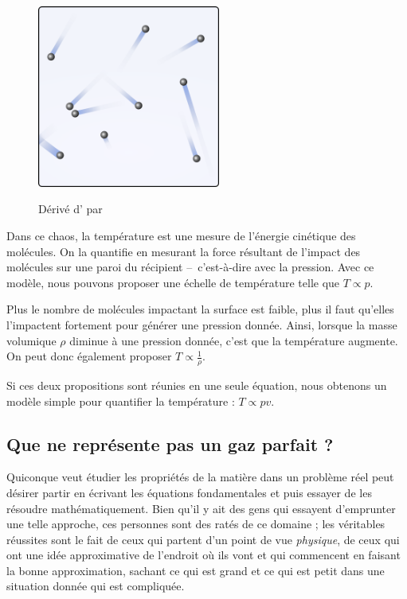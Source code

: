 		\begin{figure}
			\begin{center}
				\includegraphics[width=6cm]{images/gaz_boules.png}
			\end{center}
			{Dérivé d’ \ccbysa par }
			\label{fig_gaz_boules}
		\end{figure}
		
		Dans ce chaos, la température est une mesure de l’énergie cinétique des molécules. On la quantifie en mesurant la force résultant de l’impact des molécules sur une paroi du récipient --\ c’est-à-dire avec la pression. Avec ce modèle, nous pouvons proposer une échelle de température telle que $T \propto p$.
		
		Plus le nombre de molécules impactant la surface est faible, plus il faut qu’elles l’impactent fortement pour générer une pression donnée. Ainsi, lorsque la masse volumique $\rho$ diminue à une pression donnée, c’est que la température augmente. On peut donc également proposer $T \propto \frac{1}{\rho}$.
		
		Si ces deux propositions sont réunies en une seule équation, nous obtenons un modèle simple pour quantifier la température : $T \propto p v$.
		
		
	\subsection{Que ne représente pas un gaz parfait ?}
	\label{ch_pas_gaz_parfait}
	
			Quiconque veut étudier les propriétés de la matière dans un problème réel peut désirer partir en écrivant les équations fondamentales et puis essayer de les résoudre mathématiquement. Bien qu’il y ait des gens qui essayent d’emprunter une telle approche, ces personnes sont des ratés de ce domaine ; les véritables réussites sont le fait de ceux qui partent d’un point de vue \emph{physique}, de ceux qui ont une idée approximative de l’endroit où ils vont et qui commencent en faisant la bonne approximation, sachant ce qui est grand et ce qui est petit dans une situation donnée qui est compliquée.
	
